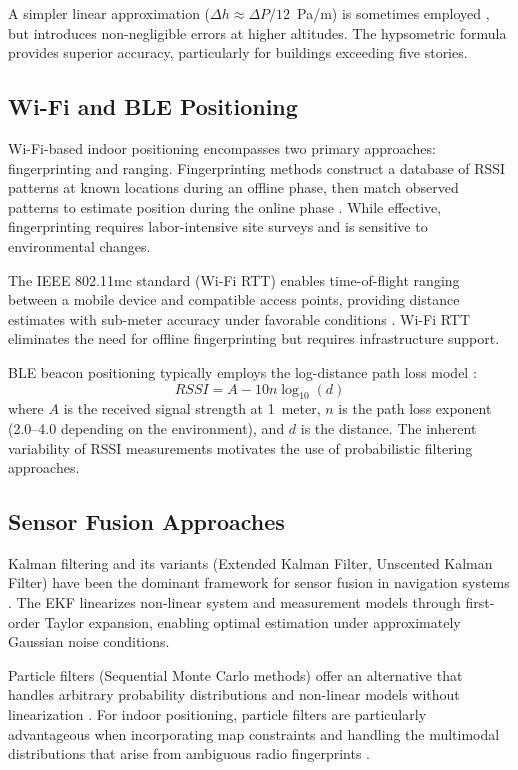 \documentclass[journal,twocolumn]{IEEEtran}
\begin{document}
A simpler linear approximation ($\Delta h \approx \Delta P / 12$~Pa/m) is sometimes employed \cite{xia2015altitude}, but introduces non-negligible errors at higher altitudes. The hypsometric formula provides superior accuracy, particularly for buildings exceeding five stories.

\subsection{Wi-Fi and BLE Positioning}

Wi-Fi-based indoor positioning encompasses two primary approaches: fingerprinting and ranging. Fingerprinting methods construct a database of RSSI patterns at known locations during an offline phase, then match observed patterns to estimate position during the online phase \cite{he2016wifi}. While effective, fingerprinting requires labor-intensive site surveys and is sensitive to environmental changes.

The IEEE 802.11mc standard (Wi-Fi RTT) enables time-of-flight ranging between a mobile device and compatible access points, providing distance estimates with sub-meter accuracy under favorable conditions \cite{ibrahim2018verification}. Wi-Fi RTT eliminates the need for offline fingerprinting but requires infrastructure support.

BLE beacon positioning typically employs the log-distance path loss model \cite{zafari2019survey}:
\begin{equation}
    RSSI = A - 10n\log_{10}(d)
    \label{eq:pathloss}
\end{equation}
where $A$ is the received signal strength at 1~meter, $n$ is the path loss exponent (2.0--4.0 depending on the environment), and $d$ is the distance. The inherent variability of RSSI measurements motivates the use of probabilistic filtering approaches.

\subsection{Sensor Fusion Approaches}

Kalman filtering and its variants (Extended Kalman Filter, Unscented Kalman Filter) have been the dominant framework for sensor fusion in navigation systems \cite{groves2013principles}. The EKF linearizes non-linear system and measurement models through first-order Taylor expansion, enabling optimal estimation under approximately Gaussian noise conditions.

Particle filters (Sequential Monte Carlo methods) offer an alternative that handles arbitrary probability distributions and non-linear models without linearization \cite{gustafsson2010particle}. For indoor positioning, particle filters are particularly advantageous when incorporating map constraints and handling the multimodal distributions that arise from ambiguous radio fingerprints \cite{davidson2017survey}.
\end{document}
